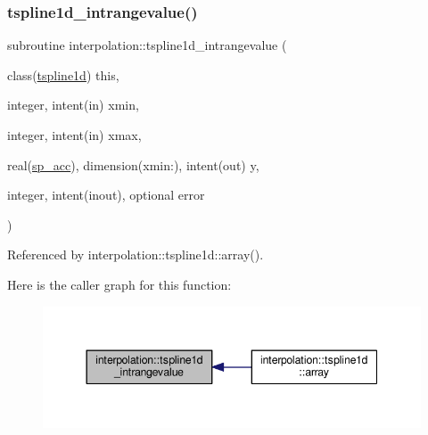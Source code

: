 \mbox{\label{namespaceinterpolation_aa9eedb8594564e9a0e57ee8a5282837a}} 
\subsubsection{\texorpdfstring{tspline1d\+\_\+intrangevalue()}{tspline1d\_intrangevalue()}}
{\footnotesize\ttfamily subroutine interpolation\+::tspline1d\+\_\+intrangevalue (\begin{DoxyParamCaption}\item[{class(\mbox{\hyperlink{structinterpolation_1_1tspline1d}{tspline1d}})}]{this,  }\item[{integer, intent(in)}]{xmin,  }\item[{integer, intent(in)}]{xmax,  }\item[{real(\mbox{\hyperlink{namespaceinterpolation_af72aa9a05feb8ef90b2d26e4a013abf3}{sp\+\_\+acc}}), dimension(xmin\+:), intent(out)}]{y,  }\item[{integer, intent(inout), optional}]{error }\end{DoxyParamCaption})}



Referenced by interpolation\+::tspline1d\+::array().

Here is the caller graph for this function\+:
\nopagebreak
\begin{figure}[H]
\begin{center}
\leavevmode
\includegraphics[width=344pt]{namespaceinterpolation_aa9eedb8594564e9a0e57ee8a5282837a_icgraph}
\end{center}
\end{figure}
\mbox{\label{namespaceinterpolation_a7a675d7e22aea0d85c1c2241ee6c221f}} 
